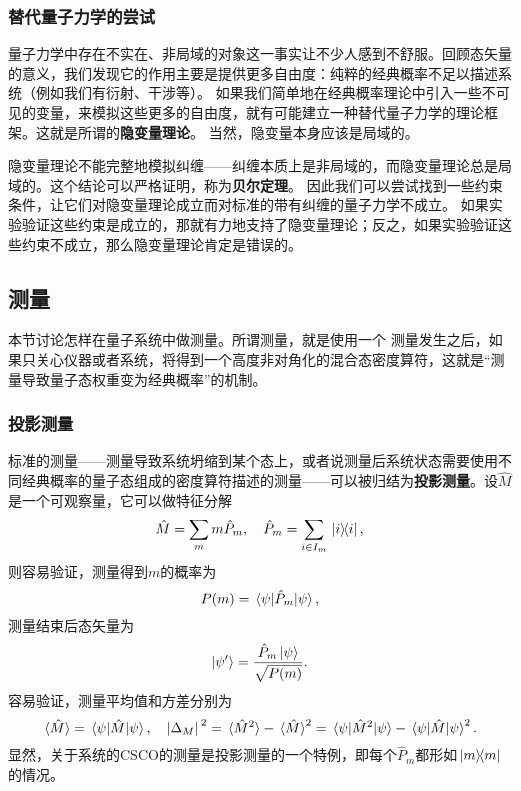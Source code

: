 \documentclass[UTF8, a4paper]{ctexart}
\begin{document}
\subsubsection{替代量子力学的尝试}

量子力学中存在不实在、非局域的对象这一事实让不少人感到不舒服。回顾态矢量的意义，我们发现它的作用主要是提供更多自由度：纯粹的经典概率不足以描述系统（例如我们有衍射、干涉等）。
如果我们简单地在经典概率理论中引入一些不可见的变量，来模拟这些更多的自由度，就有可能建立一种替代量子力学的理论框架。这就是所谓的\textbf{隐变量理论}。
当然，隐变量本身应该是局域的。

隐变量理论不能完整地模拟纠缠——纠缠本质上是非局域的，而隐变量理论总是局域的。这个结论可以严格证明，称为\textbf{贝尔定理}。
因此我们可以尝试找到一些约束条件，让它们对隐变量理论成立而对标准的带有纠缠的量子力学不成立。
如果实验验证这些约束是成立的，那就有力地支持了隐变量理论；反之，如果实验验证这些约束不成立，那么隐变量理论肯定是错误的。



\subsection{测量}

本节讨论怎样在量子系统中做测量。所谓测量，就是使用一个
测量发生之后，如果只关心仪器或者系统，将得到一个高度非对角化的混合态密度算符，这就是“测量导致量子态权重变为经典概率”的机制。

\subsubsection{投影测量}

标准的测量——测量导致系统坍缩到某个态上，或者说测量后系统状态需要使用不同经典概率的量子态组成的密度算符描述的测量——可以被归结为\textbf{投影测量}。设$\hat{M}$是一个可观察量，它可以做特征分解
\begin{equation}
    \hat{M} = \sum_m m \hat{P}_m, \quad \hat{P}_m = \sum_{i \in I_m} \dyad*{i}{i},
\end{equation}
则容易验证，测量得到$m$的概率为
\begin{equation}
    P(m) = \mel*{\psi}{\hat{P}_m}{\psi},
\end{equation}
测量结束后态矢量为
\begin{equation}
    \ket{\psi'} = \frac{\hat{P}_m \ket{\psi}}{\sqrt{P(m)}}.
\end{equation}
容易验证，测量平均值和方差分别为
\begin{equation}
    \expval*{\hat{M}} = \mel*{\psi}{\hat{M}}{\psi}, \quad \abs*{\Delta_M}^2 = \expval*{\hat{M}^2} - \expval*{\hat{M}}^2 = \mel*{\psi}{\hat{M}^2}{\psi} - \mel*{\psi}{\hat{M}}{\psi}^2.
\end{equation}
显然，关于系统的CSCO的测量是投影测量的一个特例，即每个$\hat{P}_m$都形如$\dyad*{m}{m}$的情况。
\end{document}
